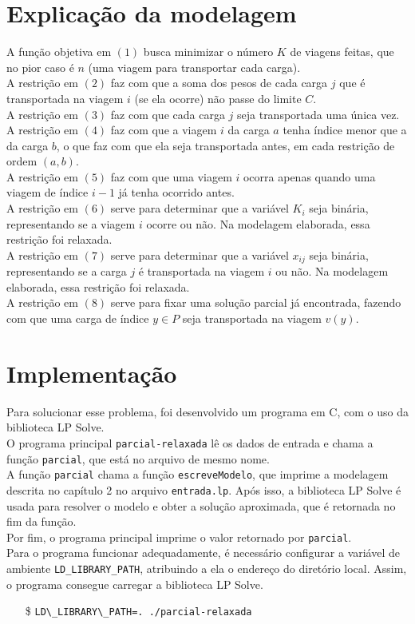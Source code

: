 \documentclass{article}
\begin{document}
\newpage
\section{Explicação da modelagem}
A função objetiva em $(1)$ busca minimizar o número $K$ de viagens feitas, que no pior caso é $n$ (uma viagem para transportar cada carga).\\
A restrição em $(2)$ faz com que a soma dos pesos de cada carga $j$ que é transportada na viagem $i$ (se ela ocorre) não passe do limite $C$.\\
A restrição em $(3)$ faz com que cada carga $j$ seja transportada uma única vez.\\
A restrição em $(4)$ faz com que a viagem $i$ da carga $a$ tenha índice menor que a da carga $b$, o que faz com que ela seja transportada antes, em cada restrição de ordem $(a, b)$.\\
A restrição em $(5)$ faz com que uma viagem $i$ ocorra apenas quando uma viagem de índice $i-1$ já tenha ocorrido antes.\\
A restrição em $(6)$ serve para determinar que a variável $K_i$ seja binária, representando se a viagem $i$ ocorre ou não. Na modelagem elaborada, essa restrição foi relaxada.\\
A restrição em $(7)$ serve para determinar que a variável $x_{ij}$ seja binária, representando se a carga $j$ é transportada na viagem $i$ ou não. Na modelagem elaborada, essa restrição foi relaxada.\\
A restrição em $(8)$ serve para fixar uma solução parcial já encontrada, fazendo com que uma carga de índice $y \in P$ seja transportada na viagem $v(y)$.

\newpage
\section{Implementação}
Para solucionar esse problema, foi desenvolvido um programa em C, com o uso da biblioteca LP Solve.\\
O programa principal \texttt{parcial-relaxada} lê os dados de entrada e chama a função \texttt{parcial}, que está no arquivo de mesmo nome.\\
A função \texttt{parcial} chama a função \texttt{escreveModelo}, que imprime a modelagem descrita no capítulo 2 no arquivo \texttt{entrada.lp}. Após isso, a biblioteca LP Solve é usada para resolver o modelo e obter a solução aproximada, que é retornada no fim da função.\\
Por fim, o programa principal imprime o valor retornado por \texttt{parcial}.\\
Para o programa funcionar adequadamente, é necessário configurar a variável de ambiente \texttt{LD\_LIBRARY\_PATH}, atribuindo a ela o endereço do diretório local. Assim, o programa consegue carregar a biblioteca LP Solve.
\begin{enumerate}
    \item[\$] \verb|LD\_LIBRARY\_PATH=. ./parcial-relaxada|
\end{enumerate}
\end{document}

